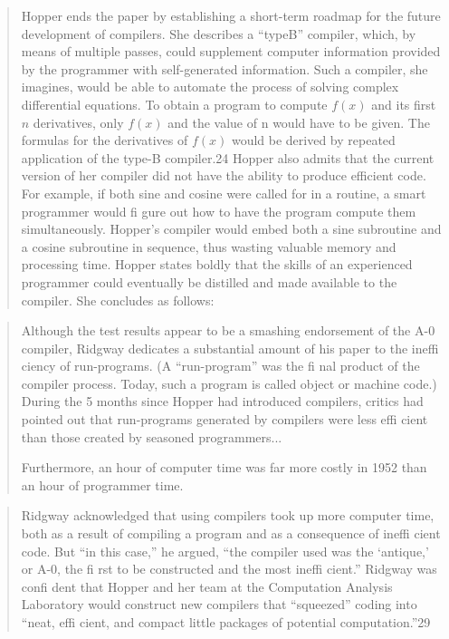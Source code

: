 \begin{quotation}
Hopper ends the paper by establishing a short-term roadmap
for the future development of compilers. She describes a “typeB” compiler, which, by means of multiple passes, could supplement computer information provided by the programmer with
self-generated information. Such a compiler, she imagines, would
be able to automate the process of solving complex differential
equations. To obtain a program to compute $f(x)$ and its first $n$
derivatives, only $f(x)$ and the value of n would have to be given.
The formulas for the derivatives of $f(x)$ would be derived by
repeated application of the type-B compiler.24
Hopper also admits that the current version of her compiler
did not have the ability to produce efficient code. For example,
if both sine and cosine were called for in a routine, a smart
programmer would fi gure out how to have the program compute them simultaneously. Hopper’s compiler would embed both
a sine subroutine and a cosine subroutine in sequence, thus
wasting valuable memory and processing time. Hopper states
boldly that the skills of an experienced programmer could eventually be distilled and made available to the compiler. She concludes as follows:
\end{quotation}

\begin{quotation}
Although the test results appear to be a smashing endorsement
of the A-0 compiler, Ridgway dedicates a substantial amount of
his paper to the ineffi ciency of run-programs. (A “run-program”
was the fi nal product of the compiler process. Today, such a
program is called object or machine code.) During the 5 months
since Hopper had introduced compilers, critics had pointed out
that run-programs generated by compilers were less effi cient than
those created by seasoned programmers... 

Furthermore, an hour of computer time was far more costly in 1952 than an hour of programmer time. 
\end{quotation}

\begin{quotation}
Ridgway acknowledged that using compilers took up more
computer time, both as a result of compiling a program and as
a consequence of ineffi cient code. But “in this case,” he argued,
“the compiler used was the ‘antique,’ or A-0, the fi rst to be
constructed and the most ineffi cient.” Ridgway was confi dent
that Hopper and her team at the Computation Analysis Laboratory would construct new compilers that “squeezed” coding
into “neat, effi cient, and compact little packages of potential
computation.”29
\end{quotation}


